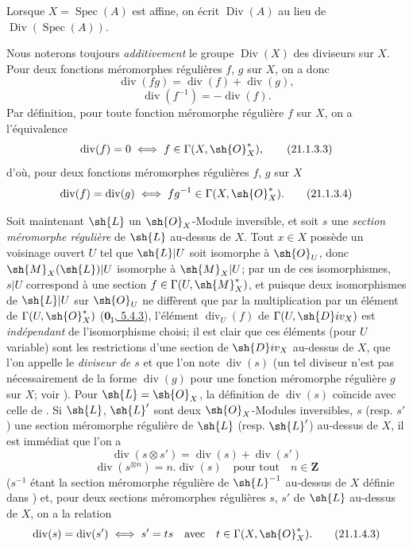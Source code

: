 Lorsque $X=\operatorname{Spec}(A)$ est affine, on écrit $\operatorname{Div}(A)$ au lieu de $\operatorname{Div}(\operatorname{Spec}(A))$.

\begin{env}[21.1.3]
\label{IV.21.1.3}
Nous noterons toujours \emph{additivement} le groupe $\operatorname{Div}(X)$ des diviseurs sur $X$.
Pour deux fonctions méromorphes régulières $f$, $g$ sur $X$, on a donc
\[
\label{IV.21.1.3.1}
  \operatorname{div}(fg)=\operatorname{div}(f)+\operatorname{div}(g),
  \tag{21.1.3.1}
\]
\[
\label{IV.21.1.3.2}
  \operatorname{div}(f^{-1})=-\operatorname{div}(f).
  \tag{21.1.3.2}
\]
Par définition, pour toute fonction méromorphe régulière $f$ sur $X$, on a l'équivalence
\[
\label{IV.21.1.3.3}
  \operatorname{div}(f)=0 \iff f\in\Gamma(X,\sh{O}_X^*),
  \tag{21.1.3.3}
\]
d'où, pour deux fonctions méromorphes régulières $f$, $g$ sur $X$
\[
\label{IV.21.1.3.4}
  \operatorname{div}(f)=\operatorname{div}(g) \iff fg^{-1}\in\Gamma(X,\sh{O}_X^*).
  \tag{21.1.3.4}
\]
\end{env}

\begin{env}[21.1.4]
\label{IV.21.1.4}
Soit maintenant $\sh{L}$ un $\sh{O}_X$-Module inversible, et soit $s$ une \emph{section méromorphe régulière}  de $\sh{L}$ au-dessus de $X$.
Tout $x\in X$ possède un voisinage ouvert $U$ tel que $\sh{L}|U$ soit isomorphe à $\sh{O}_U$, donc $\sh{M}_X(\sh{L})|U$ isomorphe à $\sh{M}_X|U$;
par un de ces isomorphismes, $s|U$ correspond à une section $f\in\Gamma(U,\sh{M}_X^*)$, et puisque deux isomorphismes de $\sh{L}|U$ sur $\sh{O}_U$ ne diffèrent que par la multiplication par un élément de $\Gamma(U,\sh{O}_X^*)$ (\hyperref[0.5.4.3]{$\mathbf{0}_{\mathrm I}$, 5.4.3}), l'élément $\operatorname{div}_U(f)$ de $\Gamma(U,\sh{D}iv_X)$ est \emph{indépendant} de l'isomorphisme choisi;
il est clair que ces éléments (pour $U$ variable) sont les restrictions d'une section de $\sh{D}iv_X$ au-dessus de $X$, que l'on appelle le \emph{diviseur de $s$} et que l'on note $\operatorname{div}(s)$ (un tel diviseur n'est pas nécessairement de la forme $\operatorname{div}(g)$ pour une fonction méromorphe régulière $g$ sur $X$; voir ).
Pour $\sh{L}=\sh{O}_X$, la définition de $\operatorname{div}(s)$ coïncide avec celle de .
Si $\sh{L}$, $\sh{L}'$ sont deux $\sh{O}_X$-Modules inversibles, $s$ (resp. $s'$) une section méromorphe régulière de $\sh{L}$ (resp. $\sh{L}'$) au-dessus de $X$, il est immédiat que l'on a
\[
\label{IV.21.1.4.1}
  \operatorname{div}(s\otimes s')=\operatorname{div}(s)+\operatorname{div}(s')
  \tag{21.1.4.1}
\]
\[
\label{IV.21.1.4.2}
  \operatorname{div}(s^{\otimes n})=n.\operatorname{div}(s) \quad\text{pour tout}\quad n\in\mathbf{Z}
  \tag{21.1.4.2}
\]
($s^{-1}$ étant la section méromorphe régulière de $\sh{L}^{-1}$ au-dessus de $X$ définie dans )
et, pour deux sections méromorphes régulières $s$, $s'$ de $\sh{L}$ au-dessus de $X$, on a la relation
\[
\label{IV.21.1.4.3}
  \operatorname{div}(s)=\operatorname{div}(s') \iff s'=ts \quad\text{avec}\quad t\in\Gamma(X,\sh{O}_X^*).
  \tag{21.1.4.3}
\]
\end{env}

